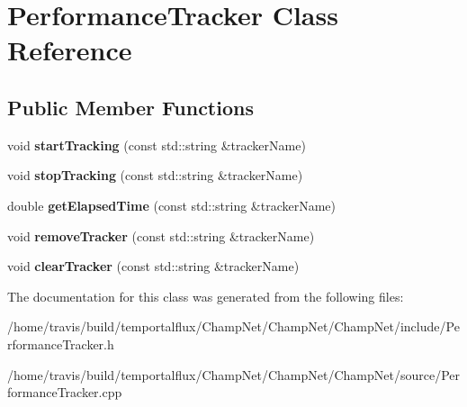\hypertarget{class_performance_tracker}{\section{Performance\-Tracker Class Reference}
\label{class_performance_tracker}
}
\subsection*{Public Member Functions}
\begin{DoxyCompactItemize}
\item 
\hypertarget{class_performance_tracker_abffee8acc3818592a7011dec4c6100c8}{void {\bfseries start\-Tracking} (const std\-::string \&tracker\-Name)}\label{class_performance_tracker_abffee8acc3818592a7011dec4c6100c8}

\item 
\hypertarget{class_performance_tracker_ac1dfa09a27f6dd1baeeb8068b009a432}{void {\bfseries stop\-Tracking} (const std\-::string \&tracker\-Name)}\label{class_performance_tracker_ac1dfa09a27f6dd1baeeb8068b009a432}

\item 
\hypertarget{class_performance_tracker_a6197691d9a0e4bce1d69e78a589a31fb}{double {\bfseries get\-Elapsed\-Time} (const std\-::string \&tracker\-Name)}\label{class_performance_tracker_a6197691d9a0e4bce1d69e78a589a31fb}

\item 
\hypertarget{class_performance_tracker_a0caacd20bc7e668cdfb9ef9567df6aeb}{void {\bfseries remove\-Tracker} (const std\-::string \&tracker\-Name)}\label{class_performance_tracker_a0caacd20bc7e668cdfb9ef9567df6aeb}

\item 
\hypertarget{class_performance_tracker_a81acadf369ceab082eea07241eb14866}{void {\bfseries clear\-Tracker} (const std\-::string \&tracker\-Name)}\label{class_performance_tracker_a81acadf369ceab082eea07241eb14866}

\end{DoxyCompactItemize}


The documentation for this class was generated from the following files\-:\begin{DoxyCompactItemize}
\item 
/home/travis/build/temportalflux/\-Champ\-Net/\-Champ\-Net/\-Champ\-Net/include/Performance\-Tracker.\-h\item 
/home/travis/build/temportalflux/\-Champ\-Net/\-Champ\-Net/\-Champ\-Net/source/Performance\-Tracker.\-cpp\end{DoxyCompactItemize}
